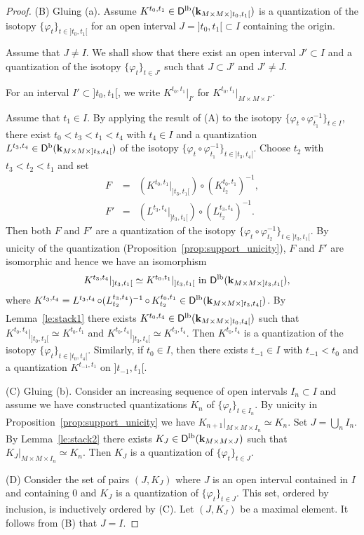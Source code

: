 \documentclass[12pt,leqno]{article}
\theoremstyle{definition}
\def\phi{{\varphi}}
\newcommand{\cor}{{\bf k}}
\newcommand{\conv}[1][]{\mathop{\circ}\limits_{#1}}
\newcommand{\opb}[1]{#1^{-1}}
\newcommand{\eqn}{\begin{eqnarray*}}
\newcommand{\eneqn}{\end{eqnarray*}}
\newcommand{\Der}[1][]{\mathsf{D}^{#1}}
\newcommand{\Derb}{\Der[\mathrm{b}]}
\newcommand{\Derlb}{\Der[\mathrm{lb}]}
\numberwithin{equation}{section}
\begin{document}
\begin{proof}
\medskip\noindent
(B) Gluing (a). Assume
$K^{t_0,t_1} \in \Derlb(\cor_{M\times M\times ]t_0,t_1[})$ is a quantization
of the isotopy $\{\phi_t\}_{t\in]t_0,t_1[}$ for an open interval 
$J=]t_0,t_1[\subset I$ containing the origin.

Assume that $J\not=I$.
We shall show that there exist an open interval $J'\subset I$ 
and a quantization of the
isotopy $\{\phi_t\}_{t\in J'}$ such that $J\subset J'$ and $J'\not=J$.

For an interval $I'\subset ]t_0,t_1[$, we write
$K^{t_0,t_1}|_{I'}$ for $K^{t_0,t_1}|_{M\times M\times I'}$.

Assume that $t_1\in I$.
By applying the result of (A) to the isotopy 
$\{\phi_t\circ\opb{\phi_{t_1}}\}_{t\in I}$,
there exist 
$t_0<t_3<t_1<t_4$ with $t_4\in I$ and a quantization $L^{t_3,t_4}
\in\Derb(\cor_{M\times M\times ]t_3,t_4[})$ of 
the isotopy $\{\phi_t\circ\opb{\phi_{t_1}}\}_{t\in]t_3,t_4[}$. 
Choose $t_2$ with $t_3<t_2<t_1$ and set
\eqn
F&=&(K^{t_0,t_1}\vert_{]t_3,t_1[})\conv
(K^{t_0,t_1}_{t_2})^{-1},\\
F'&=&(L^{t_3,t_4}\vert_{]t_3,t_1[})\conv
(L^{t_3,t_4}_{t_2})^{-1}.
\eneqn
Then both $F$ and $F'$ are a quantization of
the isotopy $\{\phi_t\circ\opb{\phi_{t_2}}\}_{t\in]t_3,t_1[}$.
By unicity of the quantization (Proposition~\ref{prop:support_unicity}),
$F$ and $F'$ are isomorphic and hence we have an isomorphism
\eqn
&&K^{t_3,t_4}\vert_{]t_3,t_1[}\simeq K^{t_0,t_1}\vert_{]t_3,t_1[}
\mbox{ in }\Derlb(\cor_{M\times M\times]t_3,t_1[}),
\eneqn
where
$K^{t_3,t_4}
=L^{t_3,t_4}\conv (L^{t_3,t_4}_{t_2})^{-1}\conv K^{t_0,t_1}_{t_2}
\in \Derlb(\cor_{M\times M\times ]t_3,t_4[})$.
By Lemma~\ref{le:stack1} there exists
$K^{t_0,t_4}\in\Derlb(\cor_{M\times M\times ]t_0,t_4[})$ such that
$K^{t_0,t_4}\vert_{]t_0,t_1[}\simeq K^{t_0,t_1}$ and
$K^{t_0,t_4}\vert_{]t_3,t_4[}\simeq K^{t_3,t_4}$. Then
$K^{t_0,t_4}$ is a quantization of the isotopy $\{\phi_t\}_{t\in]t_0,t_4[}$.
Similarly, if $t_0\in I$,
then there exists $t_{-1}\in I$ with $t_{-1}<t_0$ and a quantization
$K^{t_{-1},t_1}$ on $]t_{-1},t_1[$.

\medskip\noindent
(C) Gluing (b). Consider an increasing sequence of open intervals
$I_n\subset I$ and assume we have constructed quantizations $K_n$ of 
$\{\phi_t\}_{t\in I_n}$.
By unicity in Proposition~\ref{prop:support_unicity} we have
$K_{n+1}\vert_{M\times M\times I_n}\simeq K_n$. 
Set $J=\bigcup_nI_n$. By Lemma~\ref{le:stack2} there
exists $K_J\in \Derlb(\cor_{M\times M\times J})$ such that
$K_J\vert_{M\times M\times I_n}\simeq K_n$. Then $K_J$ is a quantization of
$\{\phi_t\}_{t\in J}$.
 
\medskip\noindent
(D) 
Consider the set of pairs $(J,K_J)$ where $J$ is an open interval contained in
$I$ and containing $0$ and $K_J$ is a quantization of $\{\phi_t\}_{t\in J}$.
This set, ordered by inclusion, is inductively ordered by (C). Let $(J,K_J)$
be a maximal element. It follows from (B) that $J=I$.
\end{proof}
\end{document}
